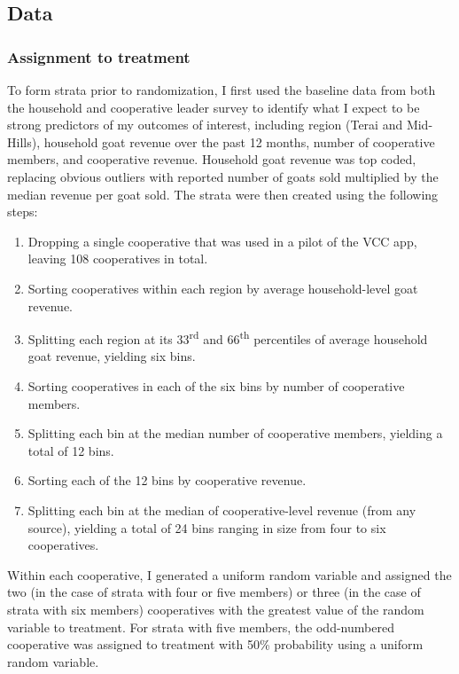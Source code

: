 \documentclass[11pt]{article}
\begin{document}
\subsection{Data} \label{E3_data}

\subsubsection{Assignment to treatment} \label{sec:E3_assignment}
To form strata prior to randomization, I first used the baseline data from both the household and cooperative leader survey to identify what I expect to be strong predictors of my outcomes of interest, including region (Terai and Mid-Hills), household goat revenue over the past 12 months, number of cooperative members, and cooperative revenue. Household goat revenue was top coded, replacing obvious outliers with reported number of goats sold multiplied by the median revenue per goat sold. The strata were then created using the following steps:
  \begin{enumerate}
  	\item Dropping a single cooperative that was used in a pilot of the VCC app, leaving 108 cooperatives in total.
    \item Sorting cooperatives within each region by average household-level goat revenue.
    \item Splitting each region at its 33\textsuperscript{rd} and 66\textsuperscript{th} percentiles of average household goat revenue, yielding six bins.
    \item Sorting cooperatives in each of the six bins by number of cooperative members.
    \item Splitting each bin at the median number of cooperative members, yielding a total of 12 bins.
    \item Sorting each of the 12 bins by cooperative revenue.
    \item Splitting each bin at the median of cooperative-level revenue (from any source), yielding a total of 24 bins ranging in size from four to six cooperatives. 
  \end{enumerate}

Within each cooperative, I generated a uniform random variable and assigned the two (in the case of strata with four or five members) or three (in the case of strata with six members) cooperatives with the greatest value of the random variable to treatment. For strata with five members, the odd-numbered cooperative was assigned to treatment with 50\% probability using a uniform random variable. 
\end{document}
